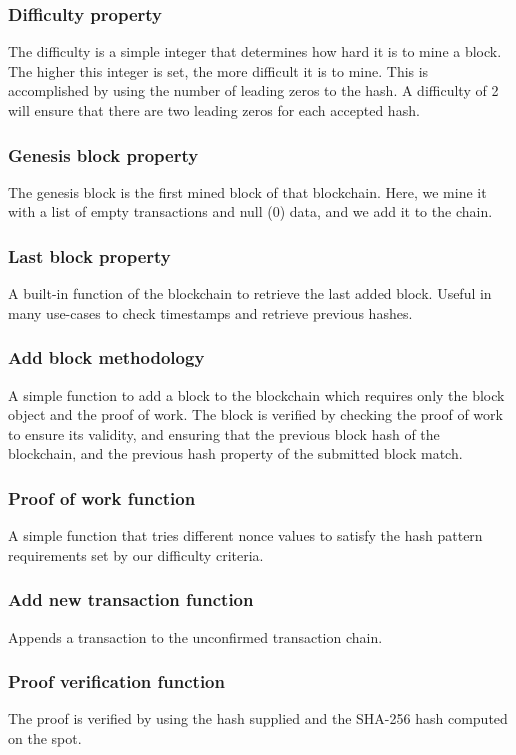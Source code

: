 \documentclass{article}
\begin{document}
    \subsubsection{Difficulty property}
    The difficulty is a simple integer that determines how hard it is to mine a block. The higher this integer is set, the more difficult it is to mine. This is accomplished by using the number of leading zeros to the hash. A difficulty of 2 will ensure that there are two leading zeros for each accepted hash.
    \subsubsection{Genesis block property}
    The genesis block is the first mined block of that blockchain. Here, we mine it with a list of empty transactions and null (0) data, and we add it to the chain.
    \subsubsection{Last block property}
    A built-in function of the blockchain to retrieve the last added block. Useful in many use-cases to check timestamps and retrieve previous hashes.
    \subsubsection{Add block methodology}
    A simple function to add a block to the blockchain which requires only the block object and the proof of work. The block is verified by checking the proof of work to ensure its validity, and ensuring that the previous block hash of the blockchain, and the previous hash property of the submitted block match.
    \subsubsection{Proof of work function}
    A simple function that tries different nonce values to satisfy the hash pattern requirements set by our difficulty criteria.
    \subsubsection{Add new transaction function}
    Appends a transaction to the unconfirmed transaction chain.
    \subsubsection{Proof verification function}
    The proof is verified by using the hash supplied and the SHA-256 hash computed on the spot.
\end{document}

